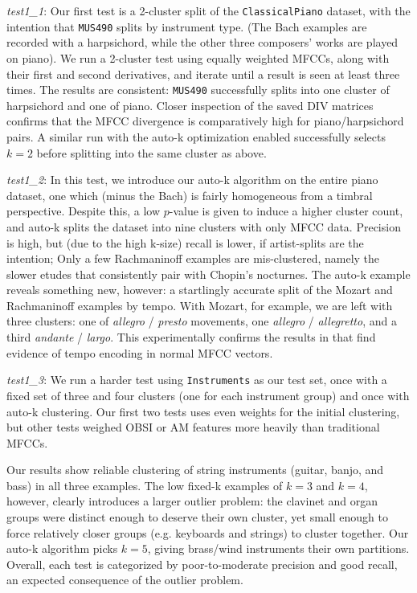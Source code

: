 \documentclass[12pt,twocolumn,titlepage]{article}
\begin{document}
\emph{test1\_1}: Our first test is a 2-cluster split of the \texttt{ClassicalPiano} dataset, with the intention that \texttt{MUS490} splits by instrument type. (The Bach examples are recorded with a harpsichord, while the other three composers' works are played on piano). We run a 2-cluster test using equally weighted MFCCs, along with their first and second derivatives, and iterate until a result is seen at least three times. The results are consistent: \texttt{MUS490} successfully splits into one cluster of harpsichord and one of piano. Closer inspection of the saved DIV matrices confirms that the MFCC divergence is comparatively high for piano/harpsichord pairs. A similar run with the auto-k optimization enabled successfully selects $k = 2$ before splitting into the same cluster as above.

\emph{test1\_2}: In this test, we introduce our auto-k algorithm on the entire piano dataset, one which (minus the Bach) is fairly homogeneous from a timbral perspective. Despite this, a low $p$-value is given to induce a higher cluster count, and auto-k splits the dataset into nine clusters with only MFCC data. Precision is high, but (due to the high k-size) recall is lower, if artist-splits are the intention; Only a few Rachmaninoff examples are mis-clustered, namely the slower etudes that consistently pair with Chopin's nocturnes. The auto-k example reveals something new, however: a startlingly accurate split of the Mozart and Rachmaninoff examples by tempo. With Mozart, for example, we are left with three clusters: one of \emph{allegro} / \emph{presto} movements, one \emph{allegro} / \emph{allegretto}, and a third \emph{andante} / \emph{largo}. This experimentally confirms the results in \cite{LiChan} that find evidence of tempo encoding in normal MFCC vectors.

\emph{test1\_3}: We run a harder test using \texttt{Instruments} as our test set, once with a fixed set of three and four clusters (one for each instrument group) and once with auto-k clustering. Our first two tests uses even weights for the initial clustering, but other tests weighed OBSI or AM features more heavily than traditional MFCCs.

Our results show reliable clustering of string instruments (guitar, banjo, and bass) in all three examples. The low fixed-k examples of $k=3$ and $k=4$, however, clearly introduces a larger outlier problem: the clavinet and organ groups were distinct enough to deserve their own cluster, yet small enough to force relatively closer groups (e.g. keyboards and strings) to cluster together. Our auto-k algorithm picks $k=5$, giving brass/wind instruments their own partitions. Overall, each test is categorized by poor-to-moderate precision and good recall, an expected consequence of the outlier problem.
\end{document}
